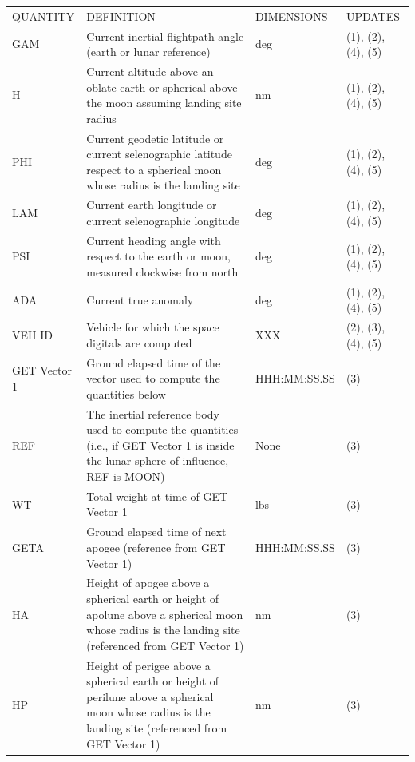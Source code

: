 \documentclass[11pt]{article} %
\begin{document}
\begin{center}
\begin{tabular}{ L{2.4cm} L{5.1cm} L{3cm} L{3.8cm} }
\underline{QUANTITY} & \underline{DEFINITION} & \underline{DIMENSIONS} & \underline{UPDATES} \\
GAM & Current inertial flightpath angle (earth or lunar reference) & deg & (1), (2), (4), (5)\\
H & Current altitude above an oblate earth or spherical above the moon assuming landing site radius & nm &(1), (2), (4), (5)\\
PHI & Current geodetic latitude or current selenographic latitude respect to a spherical moon whose radius is the landing site & deg &(1), (2), (4), (5)\\
LAM & Current earth longitude or current selenographic longitude & deg &(1), (2), (4), (5)\\
PSI & Current heading angle with respect to the earth or moon, measured clockwise from north & deg &(1), (2), (4), (5)\\
ADA & Current true anomaly & deg &(1), (2), (4), (5)\\
VEH ID & Vehicle for which the space digitals are computed & XXX & (2), (3), (4), (5)\\
GET Vector 1 & Ground elapsed time of the vector used to compute the quantities below & HHH:MM:SS.SS & (3)\\
REF & The inertial reference body used to compute the quantities (i.e., if GET Vector 1 is inside the lunar sphere of influence, REF is MOON) & None & (3)\\
WT & Total weight at time of GET Vector 1 & lbs & (3)\\
GETA & Ground elapsed time of next apogee (reference from GET Vector 1) & HHH:MM:SS.SS & (3)\\
HA & Height of apogee above a spherical earth or height of apolune above a spherical moon whose radius is the landing site (referenced from GET Vector 1) & nm & (3)\\
HP & Height of perigee above a spherical earth or height of perilune above a spherical moon whose radius is the landing site (referenced from GET Vector 1) & nm & (3)\\
\end{tabular}
\end{center}
\end{document}
